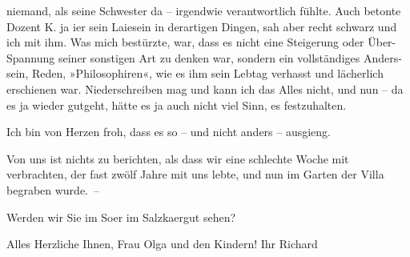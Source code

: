                niemand, als seine Schwester
               da – irgendwie verantwortlich fühlte. Auch betonte Dozent K. ja i{\geminationm}er sein Laiesein in
               derartigen Dingen, sah aber recht schwarz {\pb}und ich mit ihm. Was mich
               bestürzte, war, dass es nicht eine Steigerung oder Über-Spannung seiner sonstigen Art
               zu denken war, sondern ein vollständiges Anders-sein, Reden, »Philosophiren«, wie es
               ihm sein Lebtag verhasst und lächerlich erschienen war. Niederschreiben mag und kann
               ich das Alles nicht, und nun – da es ja wieder gutgeht, hätte es ja auch nicht viel
               Sinn, es festzuhalten.\pend
           
\pstart
           Ich bin von Herzen froh, dass es so – und nicht anders – ausgieng.\pend
           
\pstart
           Von uns ist nichts zu berichten, als dass wir eine schlechte Woche mit \label{K_L02266-1v}\label{K_L02266-1} verbrachten, der fast zwölf Jahre mit uns lebte, und nun im Garten der Villa
               begraben wurde. –\pend
           
\pstart
           Werden wir Sie im So{\geminationm}er im Salzka{\geminationm}ergut sehen?\pend
           
\pstart
           Alles Herzliche Ihnen, Frau Olga und den Kindern! Ihr\pend
           \pstart \spacefill\mbox{Richard}\pend{}\endnumbering{}  \newcommand{\dateiname}{L02266}\newcommand{\titel}{Richard Beer-Hofmann an Arthur Schnitzler, 18. 7. 1917}\newcommand{\editorInnen}{Martin Anton Müller und Gerd-Hermann Susen}
